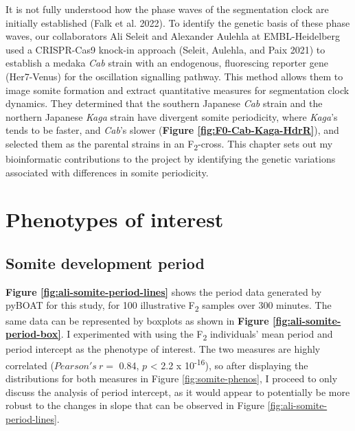 \documentclass[
]{book}
\begin{document}
It is not fully understood how the phase waves of the segmentation clock are initially established (Falk et al. 2022). To identify the genetic basis of these phase waves, our collaborators Ali Seleit and Alexander Aulehla at EMBL-Heidelberg used a CRISPR-Cas9 knock-in approach (Seleit, Aulehla, and Paix 2021) to establish a medaka \emph{Cab} strain with an endogenous, fluorescing reporter gene (Her7-Venus) for the oscillation signalling pathway. This method allows them to image somite formation and extract quantitative measures for segmentation clock dynamics. They determined that the southern Japanese \emph{Cab} strain and the northern Japanese \emph{Kaga} strain have divergent somite periodicity, where \emph{Kaga}'s tends to be faster, and \emph{Cab}'s slower (\textbf{Figure \ref{fig:F0-Cab-Kaga-HdrR}}), and selected them as the parental strains in an F\textsubscript{2}-cross. This chapter sets out my bioinformatic contributions to the project by identifying the genetic variations associated with differences in somite periodicity.

\hypertarget{somite-phenotype}{%
\section{Phenotypes of interest}\label{somite-phenotype}}

\hypertarget{somite-development-period}{%
\subsection{Somite development period}\label{somite-development-period}}

\textbf{Figure \ref{fig:ali-somite-period-lines}} shows the period data generated by pyBOAT for this study, for 100 illustrative F\textsubscript{2} samples over 300 minutes. The same data can be represented by boxplots as shown in \textbf{Figure \ref{fig:ali-somite-period-box}}. I experimented with using the F\textsubscript{2} individuals' mean period and period intercept as the phenotype of interest. The two measures are highly correlated (\(Pearson's~r =\) 0.84, \(p\) \textless{} 2.2 x 10\textsuperscript{-16}), so after displaying the distributions for both measures in Figure \ref{fig:somite-phenos}, I proceed to only discuss the analysis of period intercept, as it would appear to potentially be more robust to the changes in slope that can be observed in Figure \ref{fig:ali-somite-period-lines}.
\end{document}
